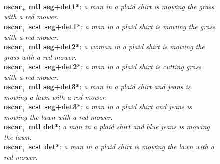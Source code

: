 \begin{figure}[H]
{        \textbf{\acrshort{oscar}$_+$ \acrshort{mtl} seg+det1*}: \textit{a man in a plaid shirt is mowing the grass with a red mower}.\\
        \textbf{\acrshort{oscar}$_+$ \acrshort{scst} seg+det1*}: \textit{a man in a plaid shirt is mowing the grass with a red mower}.\\
        \textbf{\acrshort{oscar}$_+$ \acrshort{mtl} seg+det2*}: \textit{a woman in a plaid shirt is mowing the grass with a red mower}.\\
        \textbf{\acrshort{oscar}$_+$ \acrshort{scst} seg+det2*}: \textit{a man in a plaid shirt is cutting grass with a red mower}.\\
        \textbf{\acrshort{oscar}$_+$ \acrshort{mtl} seg+det3*}: \textit{a man in a plaid shirt and jeans is mowing a lawn with a red mower}.\\
        \textbf{\acrshort{oscar}$_+$ \acrshort{scst} seg+det3*}: \textit{a man in a plaid shirt and jeans is mowing the lawn with a red mower}.\\
        \textbf{\acrshort{oscar}$_+$ \acrshort{mtl} det*}: \textit{a man in a plaid shirt and blue jeans is mowing the lawn}.\\
        \textbf{\acrshort{oscar}$_+$ \acrshort{scst} det*}: \textit{a man in a plaid shirt is mowing the lawn with a red mower}.
        }
        \label{fig:test3}
\end{figure}

